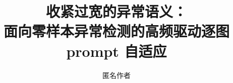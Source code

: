 \documentclass[11pt,fontset=none]{ctexart}
\title{\bfseries 收紧过宽的异常语义：\\面向零样本异常检测的高频驱动逐图 prompt 自适应}
\author{匿名作者}
\date{}
\begin{document}
\maketitle
\begin{abstract}

\end{abstract}
\vspace{0.6em}











\appendix

\end{document}
